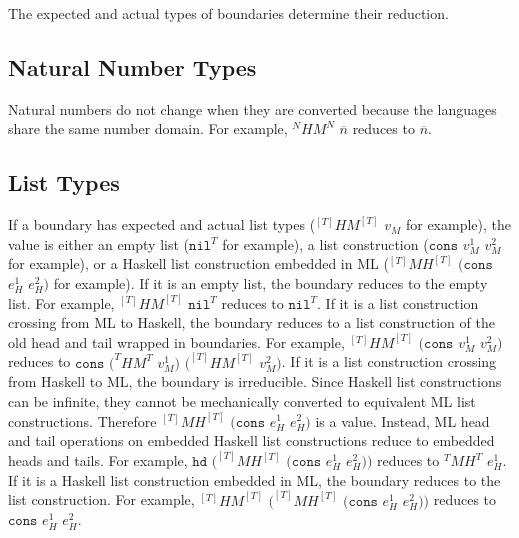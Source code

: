 The expected and actual types of boundaries determine their reduction.

\subsection{Natural Number Types}

Natural numbers do not change when they are converted because the languages share the same number domain.  For example, $^{N}HM^{N}$ $\overline{n}$ reduces to $\overline{n}$.

\subsection{List Types}

If a boundary has expected and actual list types ($^{[T]}HM^{[T]}$ $v_{M}$ for example), the value is either an empty list ($\mathtt{nil}^{T}$ for example), a list construction ($\mathtt{cons}$ $v_{M}^{1}$ $v_{M}^{2}$ for example), or a Haskell list construction embedded in ML ($^{[T]}MH^{[T]}$ $(\mathtt{cons}$ $e_{H}^{1}$ $e_{H}^{2})$ for example).  If it is an empty list, the boundary reduces to the empty list.  For example, $^{[T]}HM^{[T]}$ $\mathtt{nil}^{T}$ reduces to $\mathtt{nil}^{T}$.  If it is a list construction crossing from ML to Haskell, the boundary reduces to a list construction of the old head and tail wrapped in boundaries.  For example, $^{[T]}HM^{[T]}$ $(\mathtt{cons}$ $v_{M}^{1}$ $v_{M}^{2})$ reduces to $\mathtt{cons}$ $(^{T}HM^{T}$ $v_{M}^{1})$ $(^{[T]}HM^{[T]}$ $v_{M}^{2})$.  If it is a list construction crossing from Haskell to ML, the boundary is irreducible.  Since Haskell list constructions can be infinite, they cannot be mechanically converted to equivalent ML list constructions.  Therefore $^{[T]}MH^{[T]}$ $(\mathtt{cons}$ $e_{H}^{1}$ $e_{H}^{2})$ is a value.  Instead, ML head and tail operations on embedded Haskell list constructions reduce to embedded heads and tails.  For example, $\mathtt{hd}$ $(^{[T]}MH^{[T]}$ $(\mathtt{cons}$ $e_{H}^{1}$ $e_{H}^{2}))$ reduces to $^{T}MH^{T}$ $e_{H}^{1}$.  If it is a Haskell list construction embedded in ML, the boundary reduces to the list construction.  For example, $^{[T]}HM^{[T]}$ $(^{[T]}MH^{[T]}$ $(\mathtt{cons}$ $e_{H}^{1}$ $e_{H}^{2}))$ reduces to $\mathtt{cons}$ $e_{H}^{1}$ $e_{H}^{2}$.

